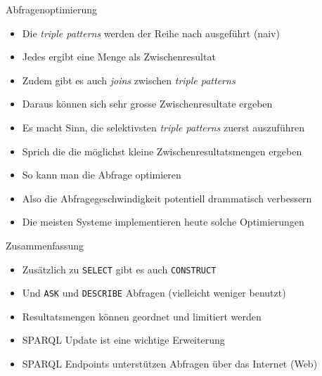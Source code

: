 \documentclass{beamer}
\begin{document}
\begin{frame}{Abfragenoptimierung}
	
	\begin{itemize}
		\item Die \emph{triple patterns} werden der Reihe nach ausgeführt (naiv)
		\item Jedes ergibt eine Menge als Zwischenresultat
		\item Zudem gibt es auch \emph{joins} zwischen \emph{triple patterns}
		\item Daraus können sich sehr grosse Zwischenresultate ergeben
		\item Es macht Sinn, die selektivsten \emph{triple patterns} zuerst auszuführen
		\item Sprich die die möglichst kleine Zwischenresultatsmengen ergeben
		\item So kann man die Abfrage optimieren
		\item Also die Abfragegeschwindigkeit potentiell drammatisch verbessern
		\item Die meisten Systeme implementieren heute solche Optimierungen
	\end{itemize}
	
\end{frame}

\begin{frame}{Zusammenfassung}
	
	\begin{itemize}
		\item Zusätzlich zu \texttt{SELECT} gibt es auch \texttt{CONSTRUCT}
		\item Und \texttt{ASK} und \texttt{DESCRIBE} Abfragen (vielleicht weniger benutzt)
		\item Resultatsmengen können geordnet und limitiert werden
		\item SPARQL Update ist eine wichtige Erweiterung
		\item SPARQL Endpoints unterstützen Abfragen über das Internet (Web)
	\end{itemize}
	
\end{frame}
\end{document}
